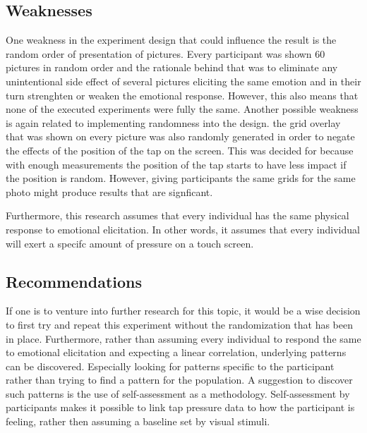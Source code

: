 \documentclass{sigchi}
\begin{document}
\subsection{Weaknesses}
One weakness in the experiment design that could influence the result is the random order of presentation of pictures. Every participant was shown 60 pictures in random order and the rationale behind that was to eliminate any unintentional side effect of several pictures eliciting the same emotion and in their turn strenghten or weaken the emotional response. However, this also means that none of the executed experiments were fully the same. Another possible weakness is again related to implementing randomness into the design. the grid overlay that was shown on every picture was also randomly generated in order to negate the effects of the position of the tap on the screen. This was decided for because with enough measurements the position of the tap starts to have less impact if the position is random. However, giving participants the same grids for the same photo might produce results that are signficant.

Furthermore, this research assumes that every individual has the same physical response to emotional elicitation. In other words, it assumes that every individual will exert a specifc amount of pressure on a touch screen. 

\subsection{Recommendations} %
\label{sub:recommendations}
If one is to venture into further research for this topic, it would be a wise decision to first try and repeat this experiment without the randomization that has been in place. Furthermore, rather than assuming every individual to respond the same to emotional elicitation and expecting a linear correlation, underlying patterns can be discovered. Especially looking for patterns specific to the participant rather than trying to find a pattern for the population. A suggestion to discover such patterns is the use of self-assessment as a methodology. Self-assessment by participants makes it possible to link tap pressure data to how the participant is feeling, rather then assuming a baseline set by visual stimuli.


\end{document}
